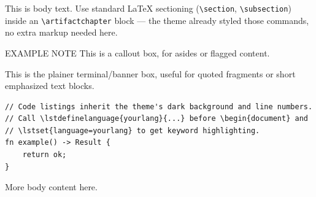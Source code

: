 \documentclass[12pt, a4paper]{book}
\begin{document}
\artifacttitlepage
\artifacttoc



This is body text. Use standard LaTeX sectioning
(\texttt{\textbackslash section}, \texttt{\textbackslash subsection}) inside
an \texttt{\textbackslash artifactchapter} block — the theme already styled
those commands, no extra markup needed here.

\begin{artifactnote}{EXAMPLE NOTE}
This is a callout box, for asides or flagged content.
\end{artifactnote}

\begin{artifactglyphbox}
This is the plainer terminal/banner box, useful for quoted fragments
or short emphasized text blocks.
\end{artifactglyphbox}

\begin{lstlisting}
// Code listings inherit the theme's dark background and line numbers.
// Call \lstdefinelanguage{yourlang}{...} before \begin{document} and
// \lstset{language=yourlang} to get keyword highlighting.
fn example() -> Result {
    return ok;
}
\end{lstlisting}

\artifactendsection


More body content here.

\artifactendsection
\end{document}
